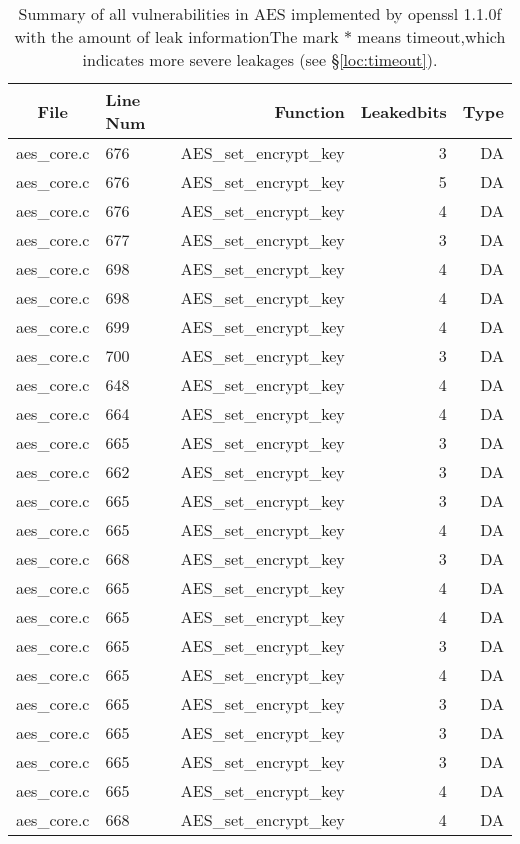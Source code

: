 \begin{table}%
\centering\scriptsize
\caption{Summary of all vulnerabilities in AES implemented by openssl 1.1.0f with the amount of leak informationThe mark $*$ means timeout,which indicates more severe leakages (see \S\ref{loc:timeout}).}\label{tab:AESopenssl}
\begin{tabular}{clrrr}
\hline
\textbf{File} & \textbf{Line Num} & \textbf{Function} & \textbf{Leakedbits} & \textbf{Type} \\\hline
aes\_core.c& 676&AES\_set\_encrypt\_key&3 &DA\\
aes\_core.c& 676&AES\_set\_encrypt\_key&5 &DA\\
aes\_core.c& 676&AES\_set\_encrypt\_key&4 &DA\\
aes\_core.c& 677&AES\_set\_encrypt\_key&3 &DA\\
aes\_core.c& 698&AES\_set\_encrypt\_key&4 &DA\\
aes\_core.c& 698&AES\_set\_encrypt\_key&4 &DA\\
aes\_core.c& 699&AES\_set\_encrypt\_key&4 &DA\\
aes\_core.c& 700&AES\_set\_encrypt\_key&3 &DA\\
aes\_core.c& 648&AES\_set\_encrypt\_key&4 &DA\\
aes\_core.c& 664&AES\_set\_encrypt\_key&4 &DA\\
aes\_core.c& 665&AES\_set\_encrypt\_key&3 &DA\\
aes\_core.c& 662&AES\_set\_encrypt\_key&3 &DA\\
aes\_core.c& 665&AES\_set\_encrypt\_key&3 &DA\\
aes\_core.c& 665&AES\_set\_encrypt\_key&4 &DA\\
aes\_core.c& 668&AES\_set\_encrypt\_key&3 &DA\\
aes\_core.c& 665&AES\_set\_encrypt\_key&4 &DA\\
aes\_core.c& 665&AES\_set\_encrypt\_key&4 &DA\\
aes\_core.c& 665&AES\_set\_encrypt\_key&3 &DA\\
aes\_core.c& 665&AES\_set\_encrypt\_key&4 &DA\\
aes\_core.c& 665&AES\_set\_encrypt\_key&3 &DA\\
aes\_core.c& 665&AES\_set\_encrypt\_key&3 &DA\\
aes\_core.c& 665&AES\_set\_encrypt\_key&3 &DA\\
aes\_core.c& 665&AES\_set\_encrypt\_key&4 &DA\\
aes\_core.c& 668&AES\_set\_encrypt\_key&4 &DA\\

\end{tabular}
\end{table}
